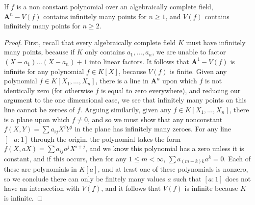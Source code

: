\begin{prop}
    If $f$ is a non constant polynomial over an algebraically complete field, $\mathbf{A}^n - V(f)$ contains infinitely many points for $n \geq 1$, and $V(f)$ contains infinitely many points for $n \geq 2$.
\end{prop}
\begin{proof}
    First, recall that every algebraically complete field $K$ must have infinitely many points, because if $K$ only contains $a_1, \dots, a_n$, we are unable to factor $(X - a_1) \dots (X - a_n) + 1$ into linear factors. It follows that $\mathbf{A}^1 - V(f)$ is infinite for any polynomial $f \in K[X]$, because $V(f)$ is finite. Given any polynomial $f \in K[X_1, \dots, X_n]$, there is a line in $\mathbf{A}^n$ upon which $f$ is not identically zero (for otherwise $f$ is equal to zero everywhere), and reducing our argument to the one dimensional case, we see that infinitely many points on this line cannot be zeroes of $f$. Arguing similarily, given any $f \in K[X_1, \dots, X_n]$, there is a plane upon which $f \neq 0$, and so we must show that any nonconstant $f(X,Y) = \sum a_{ij} X^i Y^j$ in the plane has infinitely many zeroes. For any line $[-a:1]$ through the origin, the polynomial takes the form $f(X,aX) = \sum a_{ij} a^j X^{i+j}$, and we know this polynomial has a zero unless it is constant, and if this occurs, then for any $1 \leq m < \infty$, $\sum a_{(m-k)k} a^k = 0$. Each of these are polynomials in $K[a]$, and at least one of these polynomials is nonzero, so we conclude there can only be finitely many values $a$ such that $[a:1]$ does not have an intersection with $V(f)$, and it follows that $V(f)$ is infinite because $K$ is infinite.
\end{proof}

